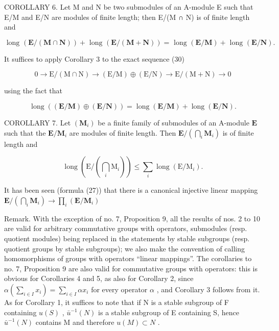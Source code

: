 COROLLARY 6. Let M and N be two submodules of an A-module E such that E/M and E/N are modules of finite length; then E/(M ∩ N) is of finite length and

\[
\text { long } (\mathbf {E} / (\mathbf {M} \cap \mathbf {N})) + \text { long } (\mathbf {E} / (\mathbf {M} + \mathbf {N})) = \text { long } (\mathbf {E} / \mathbf {M}) + \text { long } (\mathbf {E} / \mathbf {N}). \tag {41}
\]

It suffices to apply Corollary 3 to the exact sequence (30)

\[
0 \rightarrow \mathrm{E} / (\mathrm{M} \cap \mathrm{N}) \rightarrow (\mathrm{E} / \mathrm{M}) \oplus (\mathrm{E} / \mathrm{N}) \rightarrow \mathrm{E} / (\mathrm{M} + \mathrm{N}) \rightarrow 0
\]

using the fact that

\[
\operatorname{long} ((\mathbf {E} / \mathbf {M}) \oplus (\mathbf {E} / \mathbf {N})) = \operatorname{long} (\mathbf {E} / \mathbf {M}) + \operatorname{long} (\mathbf {E} / \mathbf {N}).
\]

COROLLARY 7. Let \((\mathbf{M}_i)\) be a finite family of submodules of an A-module \(\mathbf{E}\) such that the \(\mathbf{E} / \mathbf{M}_i\) are modules of finite length. Then \(\mathbf{E} / (\bigcap_{i} \mathbf{M}_i)\) is of finite length and

\[
\operatorname{long} \left(\mathrm{E} / \left(\bigcap_ {i} \mathrm{M} _ {i}\right)\right) \leqslant \sum_ {i} \operatorname{long} (\mathrm{E} / \mathrm{M} _ {i}).\tag{42}
\]

It has been seen (formula (27)) that there is a canonical injective linear mapping \(\mathbf{E} / \left(\bigcap_{i}\mathbf{M}_{i}\right)\to \prod_{i}(\mathbf{E} / \mathbf{M}_{i})\)

Remark. With the exception of no. 7, Proposition 9, all the results of nos. 2 to 10 are valid for arbitrary commutative groups with operators, submodules (resp. quotient modules) being replaced in the statements by stable subgroups (resp. quotient groups by stable subgroups); we also make the convention of calling homomorphisms of groups with operators ``linear mappings''. The corollaries to no. 7, Proposition 9 are also valid for commutative groups with operators: this is obvious for Corollaries 4 and 5, as also for Corollary 2, since \(\alpha\left(\sum_{i\in I}x_i\right)=\sum_{i\in I}\alpha x_i\) for every operator \(\alpha\) , and Corollary 3 follows from it. As for Corollary 1, it suffices to note that if N is a stable subgroup of F containing \(u(S)\) , \(\bar{u}^{-1}(N)\) is a stable subgroup of E containing S, hence \(\bar{u}^{-1}(N)\) contains M and therefore \(u(M)\subset N\) .

